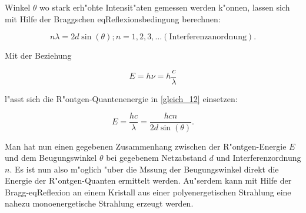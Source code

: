 	Winkel $\theta$ wo stark erh"ohte Intensit"aten gemessen werden k"onnen, lassen sich mit Hilfe der Braggschen eqReflexionsbedingung berechnen:

	\begin{equation}
		n \lambda = 2 d \sin(\theta); n = 1,2,3,\ldots (\text{Interferenzanordnung}). \label{gleich_12}
	\end{equation}

	Mit der Beziehung

	\begin{equation}
		E = h \nu = h \frac{c}{\lambda}
	\end{equation}

	l"asst sich die R"ontgen-Quantenenergie in \eqref{gleich_12} einsetzen:

	\begin{equation}
		E = \frac{hc}{\lambda} = \frac{hcn}{2d\sin(\theta)}. \label{gleich_13}
	\end{equation}

	Man hat nun einen gegebenen Zusammenhang zwischen der R"ontgen-Energie $E$ und dem Beugungswinkel $\theta$ bei gegebenem Netzabstand $d$ und Interferenzordnung $n$.
	Es ist nun also m"oglich "uber die Mssung der Beugungswinkel direkt die Energie der R"ontgen-Quanten ermittelt werden. 
	Au"serdem kann mit Hilfe der Bragg-eqReflexion an einem Kristall aus einer polyenergetischen Strahlung eine nahezu monoenergetische Strahlung erzeugt werden.